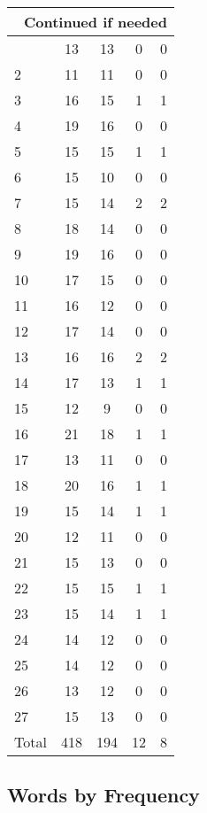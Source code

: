 \begin{center}
\begin{longtable}{l|c|c|c|c}
\hline \multicolumn{5}{|r|}{{Continued if needed}} \\ \hline
\endfoot 
1 & 13 & 13 & 0 & 0\\ \hline
2 & 11 & 11 & 0 & 0\\ \hline
3 & 16 & 15 & 1 & 1\\ \hline
4 & 19 & 16 & 0 & 0\\ \hline
5 & 15 & 15 & 1 & 1\\ \hline
6 & 15 & 10 & 0 & 0\\ \hline
7 & 15 & 14 & 2 & 2\\ \hline
8 & 18 & 14 & 0 & 0\\ \hline
9 & 19 & 16 & 0 & 0\\ \hline
10 & 17 & 15 & 0 & 0\\ \hline
11 & 16 & 12 & 0 & 0\\ \hline
12 & 17 & 14 & 0 & 0\\ \hline
13 & 16 & 16 & 2 & 2\\ \hline
14 & 17 & 13 & 1 & 1\\ \hline
15 & 12 & 9 & 0 & 0\\ \hline
16 & 21 & 18 & 1 & 1\\ \hline
17 & 13 & 11 & 0 & 0\\ \hline
18 & 20 & 16 & 1 & 1\\ \hline
19 & 15 & 14 & 1 & 1\\ \hline
20 & 12 & 11 & 0 & 0\\ \hline
21 & 15 & 13 & 0 & 0\\ \hline
22 & 15 & 15 & 1 & 1\\ \hline
23 & 15 & 14 & 1 & 1\\ \hline
24 & 14 & 12 & 0 & 0\\ \hline
25 & 14 & 12 & 0 & 0\\ \hline
26 & 13 & 12 & 0 & 0\\ \hline
27 & 15 & 13 & 0 & 0\\ \hline
\hline \hline
Total & 418 & 194 & 12 & 8




\end{longtable}
\end{center}



\subsection{Words by Frequency}

